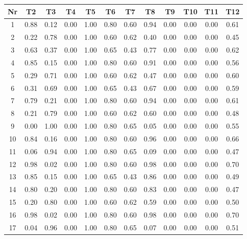 \documentclass{article}
\begin{document}
    \begin{table}[h!]
    \centering
    \begin{tabular}{|c|c|c|c|c|c|c|c|c|c|c|c|}
    \hline
    Nr & T2 & T3 & T4 & T5 & T6 & T7 & T8 & T9 & T10 & T11 & T12 \\
    \hline
    1 & 0.88 & 0.12 & 0.00 & 1.00 & 0.80 & 0.60 & 0.94 & 0.00 & 0.00 & 0.00 & 0.61 \\
    \hline
    2 & 0.22 & 0.78 & 0.00 & 1.00 & 0.60 & 0.62 & 0.40 & 0.00 & 0.00 & 0.00 & 0.45 \\
    \hline
    3 & 0.63 & 0.37 & 0.00 & 1.00 & 0.65 & 0.43 & 0.77 & 0.00 & 0.00 & 0.00 & 0.62 \\
    \hline
    4 & 0.85 & 0.15 & 0.00 & 1.00 & 0.80 & 0.60 & 0.91 & 0.00 & 0.00 & 0.00 & 0.56 \\
    \hline
    5 & 0.29 & 0.71 & 0.00 & 1.00 & 0.60 & 0.62 & 0.47 & 0.00 & 0.00 & 0.00 & 0.60 \\
    \hline
    6 & 0.31 & 0.69 & 0.00 & 1.00 & 0.65 & 0.43 & 0.67 & 0.00 & 0.00 & 0.00 & 0.59 \\
    \hline
    7 & 0.79 & 0.21 & 0.00 & 1.00 & 0.80 & 0.60 & 0.94 & 0.00 & 0.00 & 0.00 & 0.61 \\
    \hline
    8 & 0.21 & 0.79 & 0.00 & 1.00 & 0.60 & 0.62 & 0.60 & 0.00 & 0.00 & 0.00 & 0.48 \\
    \hline
    9 & 0.00 & 1.00 & 0.00 & 1.00 & 0.80 & 0.65 & 0.05 & 0.00 & 0.00 & 0.00 & 0.55 \\
    \hline
    10 & 0.84 & 0.16 & 0.00 & 1.00 & 0.80 & 0.60 & 0.96 & 0.00 & 0.00 & 0.00 & 0.66 \\
    \hline
    11 & 0.06 & 0.94 & 0.00 & 1.00 & 0.80 & 0.65 & 0.09 & 0.00 & 0.00 & 0.00 & 0.47 \\
    \hline
    12 & 0.98 & 0.02 & 0.00 & 1.00 & 0.80 & 0.60 & 0.98 & 0.00 & 0.00 & 0.00 & 0.70 \\
    \hline
    13 & 0.85 & 0.15 & 0.00 & 1.00 & 0.65 & 0.43 & 0.86 & 0.00 & 0.00 & 0.00 & 0.49 \\
    \hline
    14 & 0.80 & 0.20 & 0.00 & 1.00 & 0.80 & 0.60 & 0.83 & 0.00 & 0.00 & 0.00 & 0.47 \\
    \hline
    15 & 0.20 & 0.80 & 0.00 & 1.00 & 0.60 & 0.62 & 0.59 & 0.00 & 0.00 & 0.00 & 0.50 \\
    \hline
    16 & 0.98 & 0.02 & 0.00 & 1.00 & 0.80 & 0.60 & 0.98 & 0.00 & 0.00 & 0.00 & 0.70 \\
    \hline
    17 & 0.04 & 0.96 & 0.00 & 1.00 & 0.80 & 0.65 & 0.07 & 0.00 & 0.00 & 0.00 & 0.51 \\

\end{tabular}
\end{table}
\end{document}
